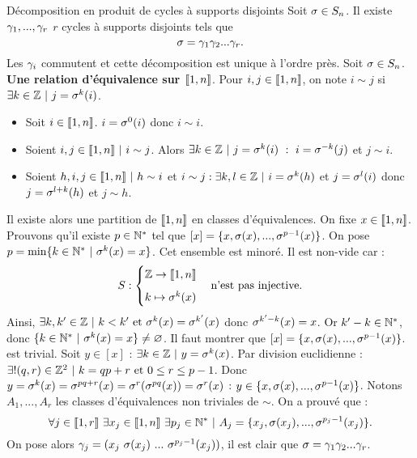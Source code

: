 \documentclass[11pt]{article}
\begin{document}
\begin{thm}{Décomposition en produit de cycles à supports disjoints}{}
    Soit $\sigma\in S_n$. Il existe $\gamma_1,...,\gamma_r$ $r$ cycles à supports disjoints tels que
    \begin{equation*}
        \sigma=\gamma_1\gamma_2...\gamma_r.
    \end{equation*}
    Les $\gamma_i$ commutent et cette décomposition est unique à l'ordre près.
    \tcblower
    Soit $\sigma\in S_n$.\n
    \textbf{Une relation d'équivalence sur $\llbracket1,n\rrbracket$}.\n
    Pour $i,j\in\llbracket1,n\rrbracket$, on note $i\sim j$ si $\exists k \in \mathbb{Z} ~ | ~ j = \sigma^k(i)$.
    \begin{itemize}
        \item Soit $i\in\llbracket1,n\rrbracket$. $i=\sigma^0(i)$ donc $i \sim i$.
        \item Soient $i,j\in\llbracket1,n\rrbracket ~ | ~ i \sim j$. Alors $\exists k \in \mathbb{Z} ~ | ~ j = \sigma^k(i) ~ : ~ i = \sigma^{-k}(j)$ et $j \sim i$.
        \item Soient $h,i,j\in\llbracket1,n\rrbracket ~ | ~ h \sim i$ et $i \sim j : \exists k,l \in \mathbb{Z} ~ | ~ i = \sigma^k(h)$ et $j=\sigma^l(i)$ donc $j=\sigma^{l+k}(h)$ et $j \sim h$.
    \end{itemize}
    Il existe alors une partition de $\llbracket1,n\rrbracket$ en classes d'équivalences.\n
    On fixe $x\in\llbracket1,n\rrbracket$.\n
    Prouvons qu'il existe $p\in\mathbb{N}^*$ tel que $[x]=\{x,\sigma(x),...,\sigma^{p-1}(x)\}$.\n
    On pose $p=\min\{k\in\mathbb{N}^* ~ | ~ \sigma^k(x)=x\}$. Cet ensemble est minoré. Il est non-vide car :
    \begin{equation*}
        S : \begin{cases}
            \Z \to \lb1,n\rb\n
            k\mapsto \s^k(x)
        \end{cases}
        \text{n'est pas injective.}
    \end{equation*}
    Ainsi, $\exists k,k' \in \mathbb{Z} ~ | ~ k < k' ~ \text{et} ~ \sigma^k(x)=\sigma^{k'}(x)$ donc $\sigma^{k'-k}(x)=x$.\n
    Or $k'-k\in\mathbb{N}^*$, donc $\{k\in\mathbb{N}^* ~ | ~ \sigma^k(x)=x\}\neq\varnothing$.\n
    Il faut montrer que $[x]=\{x,\sigma(x),...,\sigma^{p-1}(x)\}$.\n
    \fbox{$\supset$} est trivial.\n
    \fbox{$\subset$} Soit $y\in[x]$ : $\exists k \in \mathbb{Z} ~ | ~ y = \sigma^k(x)$.\n
    Par division euclidienne : $\exists!(q,r)\in\mathbb{Z}^2 ~ | ~ k = qp + r ~ \text{et} ~ 0 \leq r \leq p-1$.\n
    Donc $y = \sigma^k(x) = \sigma^{pq+r}(x) = \sigma^r(\sigma^{pq}(x))=\sigma^r(x)$ : $y\in\{x,\sigma(x),...,\sigma^{p-1}(x)\}$.\n
    Notons $A_1,...,A_r$ les classes d'équivalences non triviales de $\sim$. On a prouvé que :
    \begin{equation*}
        \forall j \in \llbracket1,r\rrbracket ~ \exists x_j \in \llbracket 1, n \rrbracket ~ \exists p_j \in \mathbb{N}^* ~ | ~ A_j = \{x_j, \sigma(x_j), ..., \sigma^{p_j-1}(x_j)\}.
    \end{equation*}
    On pose alors $\gamma_j=(x_j~\sigma(x_j)~...~\sigma^{p_j-1}(x_j))$, il est clair que $\sigma=\gamma_1\gamma_2...\gamma_r$.
\end{thm}
\end{document}
